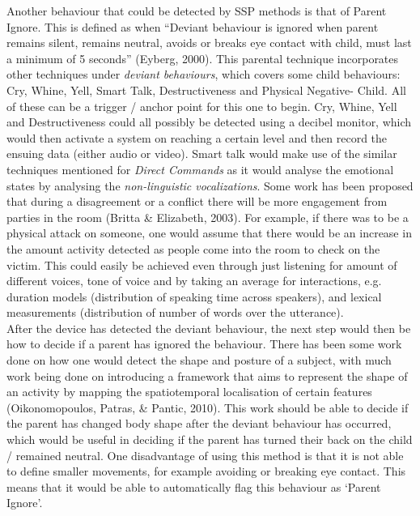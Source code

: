 \documentclass[a4paper,11pt]{report}
\begin{document}
Another behaviour that could be detected by SSP methods is that of Parent Ignore. This is defined as when “Deviant behaviour is ignored when parent remains silent, remains neutral, avoids or breaks eye contact with child, must last a minimum of 5 seconds” (Eyberg, 2000). This parental technique incorporates other techniques under \textit{deviant behaviours}, which covers some child behaviours: Cry, Whine, Yell, Smart Talk, Destructiveness and Physical Negative- Child. All of these can be a trigger / anchor point for this one to begin. Cry, Whine, Yell and Destructiveness could all possibly be detected using a decibel monitor, which would then activate a system on reaching a certain level and then record the ensuing data (either audio or video). Smart talk would make use of the similar techniques mentioned for \textit{Direct Commands} as it would analyse the emotional states by analysing the \textit{non-linguistic vocalizations}. Some work has been proposed that during a disagreement or a conflict there will be more engagement from parties in the room (Britta \& Elizabeth, 2003). For example, if there was to be a physical attack on someone, one would assume that there would be an increase in the amount activity detected as people come into the room to check on the victim. This could easily be achieved even through just listening for amount of different voices, tone of voice and by taking an average for interactions, e.g. duration models (distribution of speaking time across speakers), and lexical measurements (distribution of number of words over the utterance).\\

After the device has detected the deviant behaviour, the next step would then be how to decide if a parent has ignored the behaviour. There has been some work done on how one would detect the shape and posture of a subject, with much work being done on introducing a framework that aims to represent the shape of an activity by mapping the spatiotemporal localisation of certain features (Oikonomopoulos, Patras, \& Pantic, 2010). This work should be able to decide if the parent has changed body shape after the deviant behaviour has occurred, which would be useful in deciding if the parent has turned their back on the child / remained neutral. One disadvantage of using this method is that it is not able to define smaller movements, for example avoiding or breaking eye contact. This means that it would be able to automatically flag this behaviour as ‘Parent Ignore’.\\
\end{document}
